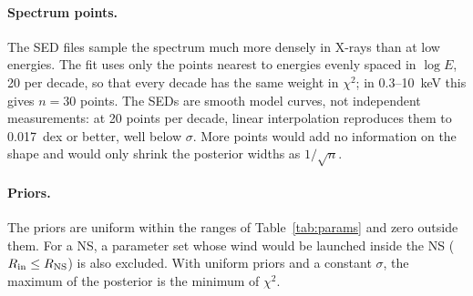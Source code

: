 \paragraph{Spectrum points.}
The SED files sample the spectrum much more densely in X-rays than at low energies.
The fit uses only the points nearest to energies evenly spaced in $\log E$, 20 per decade, so that every decade has the same weight in $\chi^2$; in 0.3--10~keV this gives $n = 30$ points.
The SEDs are smooth model curves, not independent measurements: at 20 points per decade, linear interpolation reproduces them to 0.017~dex or better, well below $\sigma$.
More points would add no information on the shape and would only shrink the posterior widths as $1/\sqrt{n}$.

\paragraph{Priors.}
The priors are uniform within the ranges of Table~\ref{tab:params} and zero outside them.
For a NS, a parameter set whose wind would be launched inside the NS ($R_{\rm in} \le R_{\rm NS}$) is also excluded.
With uniform priors and a constant $\sigma$, the maximum of the posterior is the minimum of $\chi^2$.

